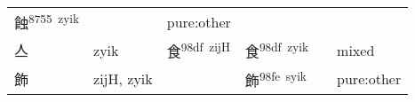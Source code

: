 \documentclass[14pt,a4paper]{scrartcl}
\begin{document}
\begin{longtable}[c]{@{}llllll@{}}
\begin{minipage}[t]{0.14\columnwidth}\raggedright\strut
蝕\textsuperscript{8755~zyik}
\strut\end{minipage} &
\begin{minipage}[t]{0.14\columnwidth}\raggedright\strut
\strut\end{minipage} &
\begin{minipage}[t]{0.14\columnwidth}\raggedright\strut
pure:other
\strut\end{minipage}\tabularnewline
\begin{minipage}[t]{0.14\columnwidth}\raggedright\strut
亼
\strut\end{minipage} &
\begin{minipage}[t]{0.14\columnwidth}\raggedright\strut
zyik
\strut\end{minipage} &
\begin{minipage}[t]{0.14\columnwidth}\raggedright\strut
食\textsuperscript{98df~zijH}
\strut\end{minipage} &
\begin{minipage}[t]{0.14\columnwidth}\raggedright\strut
食\textsuperscript{98df~zyik}
\strut\end{minipage} &
\begin{minipage}[t]{0.14\columnwidth}\raggedright\strut
\strut\end{minipage} &
\begin{minipage}[t]{0.14\columnwidth}\raggedright\strut
mixed
\strut\end{minipage}\tabularnewline
\begin{minipage}[t]{0.14\columnwidth}\raggedright\strut
飾
\strut\end{minipage} &
\begin{minipage}[t]{0.14\columnwidth}\raggedright\strut
zijH, zyik
\strut\end{minipage} &
\begin{minipage}[t]{0.14\columnwidth}\raggedright\strut
\strut\end{minipage} &
\begin{minipage}[t]{0.14\columnwidth}\raggedright\strut
飾\textsuperscript{98fe~syik}
\strut\end{minipage} &
\begin{minipage}[t]{0.14\columnwidth}\raggedright\strut
\strut\end{minipage} &
\begin{minipage}[t]{0.14\columnwidth}\raggedright\strut
pure:other
\strut\end{minipage}\tabularnewline
\bottomrule
\end{longtable}
\end{document}
